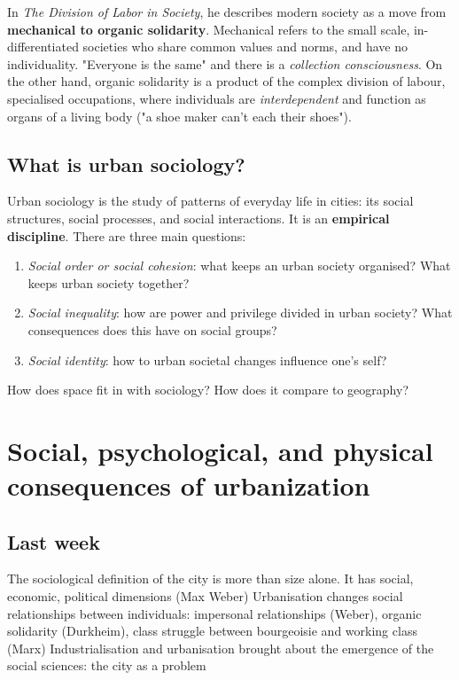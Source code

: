 \documentclass{article}
\begin{document}
In \textit{The Division of Labor in Society}, he describes modern society as a move from \textbf{mechanical to organic solidarity}. Mechanical refers to the small scale, in-differentiated societies who share common values and norms, and have no individuality. "Everyone is the same" and there is a \textit{collection consciousness}. On the other hand, organic solidarity is a product of the complex division of labour, specialised occupations, where individuals are \textit{interdependent} and function as organs of a living body ("a shoe maker can't each their shoes").

\subsection{What is urban sociology?}

Urban sociology is the study of patterns of everyday life in cities: its social structures, social processes, and social interactions. It is an \textbf{empirical discipline}. There are three main questions:

\begin{enumerate}
  \item \textit{Social order or social cohesion}: what keeps an urban society organised? What keeps urban society together?
  \item \textit{Social inequality}: how are power and privilege divided in urban society? What consequences does this have on social groups?
  \item \textit{Social identity}: how to urban societal changes influence one's self?
\end{enumerate}

How does space fit in with sociology? How does it compare to geography?


\section{Social, psychological, and physical consequences of urbanization}
\date{October 5th, 2021}

\subsection{Last week}

\begin{outline}
	\1 The sociological definition of the city is more than size alone. It has social, economic, political dimensions (Max Weber)
	\1 Urbanisation changes social relationships between individuals: impersonal relationships (Weber), organic solidarity (Durkheim), class struggle between bourgeoisie and working class (Marx)
	\1 Industrialisation and urbanisation brought about the emergence of the social sciences: the city as a problem
\end{outline}
\end{document}
